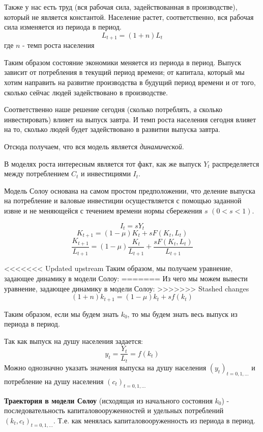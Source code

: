 \documentclass[reqno]{article}
\theoremstyle{definition}
\theoremstyle{definition}
\theoremstyle{definition}
\theoremstyle{definition}
\theoremstyle{definition}
\theoremstyle{definition}
\theoremstyle{definition}
\theoremstyle{definition}
\theoremstyle{definition}
\begin{document}
		Также у нас есть труд (вся рабочая сила, задействованная в производстве), который не является константой. Население растет, соответственно, вся рабочая сила изменяется из периода в период. 
		\begin{equation}\label{eq:1.3.3}
			L_{t+1} = (1 + n) L_t
		\end{equation}
		где $n$ - темп роста населения
		
		Таким образом состояние экономики меняется из периода в период. Выпуск зависит от потребления в текущий период времени; от капитала, который мы хотим направить на развитие производства в будущий период времени и от того, сколько сейчас людей задействовано в производстве. 
		
		Соответственно наше решение сегодня (сколько потреблять, а сколько инвестировать) влияет на выпуск завтра. И темп роста населения сегодня влияет на то, сколько людей будет задействовано в развитии выпуска завтра. 
		
		Отсюда получаем, что вся модель является \emph{динамической}.\bigskip
		
		В моделях роста интересным является тот факт, как же выпуск $Y_t$ распределяется между потреблением $C_t$ и инвестициями $I_t$.
		
		Модель Солоу основана на самом простом предположении, что деление выпуска на потребление и валовые инвестиции осуществляется с помощью заданной извне и не меняющейся с течением времени нормы сбережения $s$ $(0 < s < 1)$. 
		
		$$I_t = s Y_t$$
		$$K_{t+1} = (1 - \mu) K_t + s F(K_t, L_t)$$
		$$\frac{K_{t+1}}{L_{t+1}} = (1 - \mu) \frac{K_t}{L_{t+1}} + \frac{s F(K_t, L_t)}{L_{t+1}}$$
		
<<<<<<< Updated upstream
		Таким образом, мы получаем уравнение, задающее динамику в модели Солоу:
=======
		Из чего мы можем вывести уравнение, задающее динамику в модели Солоу:
>>>>>>> Stashed changes
		\begin{equation}\label{eq:1.3.4}
			(1 + n) k_{t + 1} = (1 - \mu) k_t + s f(k_t)
		\end{equation}
		
		Таким образом, если мы будем знать $k_0$, то мы будем знать весь выпуск из периода в период.
		
		Так как выпуск на душу населения задается:
		$$y_t = \frac{Y_t}{L_t} = f(k_t)$$
		Можно однозначно указать значения выпуска на душу населения $(y_t)_{t=0,1,\dots }$ и потребление на душу населения $(c_t)_{t=0,1,\dots}$ \bigskip
		
		\textbf{Траектория в модели Солоу} (исходящая из начального состояния $k_0$) - последовательность капиталовооруженностей и удельных потреблений $(k_t, c_t)_{t=0,1,\dots}$. Т.е. как менялась капиталовооруженность из периода в период.
		
\end{document}
